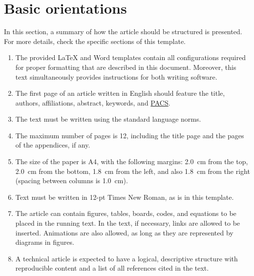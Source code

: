 \documentclass[12pt, a4paper, twoside, twocolumn]{article}
\begin{document}
\section{Basic orientations}

In this section, a summary of how the article should be structured is presented. For more details, check the specific sections of this template.

\vspace{-8pt}
\begin{enumerate} \itemsep=2pt
    \item The provided \LaTeX{} and Word templates contain all configurations required for proper formatting that are described in this document. Moreover, this text simultaneously provides instructions for both writing software.
    \item The first page of an article written in English should feature the title, authors, affiliations, abstract, keywords, and \href{https://pubs.aip.org/DocumentLibrary/files/publications/jasa/Acoustics_PACS.pdf}{PACS}.
    \item The text must be written using the standard language norms.
    \item The maximum number of pages is 12, including the title page and the pages of the appendices, if any.
    \item The size of the paper is A4, with the following margins: 2.0~cm from the top, 2.0~cm from the bottom, 1.8~cm from the left, and also 1.8~cm from the right (spacing between columns is 1.0~cm).
    \item Text must be written in 12-pt Times New Roman, as is in this template.
    \item The article can contain figures, tables, boards, codes, and equations to be placed in the running text. In the text, if necessary, links are allowed to be inserted. Animations are also allowed, as long as they are represented by diagrams in figures. 
    \item A technical article is expected to have a logical, descriptive structure with reproducible content and a list of all references cited in the text.
\end{enumerate}

\end{document}
